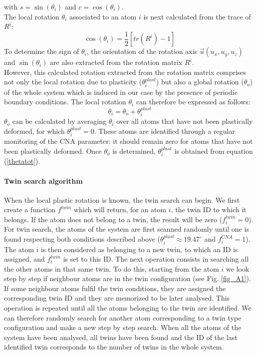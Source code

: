 \documentclass[final,3p,times,twocolumn]{elsarticle}
\begin{document}
with $ s=\sin(\theta_{i}) $ and $ c=\cos(\theta_{i}) $. \\
The local rotation $ \theta_{i} $ associated to an atom $ i $ is next calculated from the trace of $ R^{i} $:
\begin{equation}
	\cos(\theta_{i})=\frac{1}{2}\left[tr\left(R^{i}\right)-1\right]
\end{equation}
To determine the sign of $ \theta_{i} $, the orientation of the rotation axis $ \overrightarrow{u}(u_{x},u_{y},u_{z}) $ and $\sin(\theta_{i}) $ are also extracted from the rotation matrix $ R^{i} $.
\\
However, this calculated rotation extracted from the rotation matrix comprises not only the local rotation due to plasticity ($ \theta_{i}^{plast} $) but also a global rotation ($ \theta_{o} $) of the whole system which is induced in our case by the presence of periodic boundary conditions. The local rotation $ \theta_{i} $ can therefore be expressed as follows:
\begin{equation}\label{thetatot}
\theta_{i}=\theta_{o}+\theta_{i}^{plast}
\end{equation}
$ \theta_{o} $ can be calculated by averaging $ \theta_{i} $ over all atoms that have not been plastically deformed, for which $ \theta_{i}^{plast}=0 $. These atoms are identified through a regular monitoring of the CNA parameter: it should remain zero for atoms that have not been plastically deformed. Once $ \theta_{o} $ is determined, $ \theta_{i}^{plast} $ is obtained from equation (\ref{thetatot}).


\paragraph{Twin search algorithm}
When the local plastic rotation is known, the twin search can begin. We first create a function $ f^{twin} $ which will return, for an atom $ i $, the twin ID to which it belongs. If the atom does not belong to a twin, the result will be zero ($ f^{twin}_{i}=0$). For twin search, the atoms of the system are first scanned randomly until one is found respecting both conditions described above ($ \theta_{i}^{plast} \approx 19.47^{\circ} $ and $f^{CNA}_{i}=1 $). The atom $i$ is then considered as belonging to a new twin, to which an ID is assigned, and $f^{twin}_{i}$ is set to this ID. The next operation consists in searching all the other atoms in that same twin. To do this, starting from the atom $ i $ we look step by step if neighbour atoms are in the twin configuration (see Fig. \ref{fig_A1}). If some neighbour atoms fulfil the twin conditions, they are assigned the corresponding twin ID and they are memorized to be later analysed. This operation is repeated until all the atoms belonging to the twin are identified. We can therefore randomly search for another atom corresponding to a twin type configuration and make a new step by step search. When all the atoms of the system have been analysed, all twins have been found and the ID of the last identified twin corresponds to the number of twins in the whole system.
\end{document}
